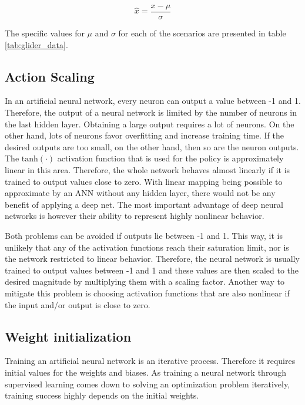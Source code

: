 \begin{equation}
\hat{x} = \frac{x - \mu}{\sigma}
\end{equation}

The specific values for $\mu$ and $\sigma$ for each of the scenarios are presented in table \ref{tab:glider_data}.

\subsection*{Action Scaling}

In an artificial neural network, every neuron can output a value between -1 and 1. Therefore, the output of a neural network is limited by the number of neurons in the last hidden layer. Obtaining a large output requires a lot of neurons. On the other hand, lots of neurons favor overfitting and increase training time. If the desired outputs are too small, on the other hand, then so are the neuron outputs. The $\text{tanh}(\cdot)$ activation function that is used for the policy is approximately linear in this area. Therefore, the whole network behaves almost linearly if it is trained to output values close to zero. With linear mapping being possible to approximate by an ANN without any hidden layer, there would not be any benefit of applying a deep net. The most important advantage of deep neural networks is however their ability to represent highly nonlinear behavior.

Both problems can be avoided if outputs lie between -1 and 1. This way, it is unlikely that any of the activation functions reach their saturation limit, nor is the network restricted to linear behavior. Therefore, the neural network is usually trained to output values between -1 and 1 and these values are then scaled to the desired magnitude by multiplying them with a scaling factor. Another way to mitigate this problem is choosing activation functions that are also nonlinear if the input and/or output is close to zero.

\subsection*{Weight initialization}

Training an artificial neural network is an iterative process. Therefore it requires initial values for the weights and biases. As training a neural network through supervised learning comes down to solving an optimization problem iteratively, training success highly depends on the initial weights.

